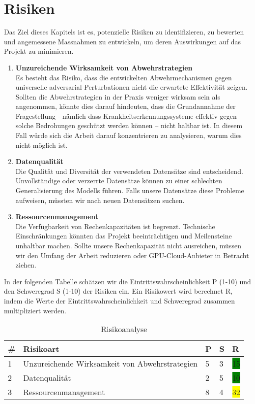 \section{Risiken}
Das Ziel dieses Kapitels ist es, potenzielle Risiken zu identifizieren, zu bewerten und angemessene Massnahmen zu entwickeln, um deren Auswirkungen auf das Projekt zu minimieren.

\begin{enumerate}
    \item \textbf{Unzureichende Wirksamkeit von Abwehrstrategien} \\ 
    Es besteht das Risiko, dass die entwickelten Abwehrmechanismen gegen universelle adversarial Perturbationen nicht die erwartete Effektivität zeigen. Sollten die Abwehrstrategien in der Praxis weniger wirksam sein als angenommen, könnte dies darauf hindeuten, dass die Grundannahme der Fragestellung - nämlich dass Krankheitserkennungssysteme effektiv gegen solche Bedrohungen geschützt werden können – nicht haltbar ist. In diesem Fall würde sich die Arbeit darauf konzentrieren zu analysieren, warum dies nicht möglich ist.

    \item \textbf{Datenqualität} \\
    Die Qualität und Diversität der verwendeten Datensätze sind entscheidend. Unvollständige oder verzerrte Datensätze können zu einer schlechten Generalisierung des Modells führen. Falls unsere Datensätze diese Probleme aufweisen, müssten wir nach neuen Datensätzen suchen.
    
    \item \textbf{Ressourcenmanagement} \\
    Die Verfügbarkeit von Rechenkapazitäten ist begrenzt. Technische Einschränkungen könnten das Projekt beeinträchtigen und Meilensteine unhaltbar machen. Sollte unsere Rechenkapazität nicht ausreichen, müssen wir den Umfang der Arbeit reduzieren oder GPU-Cloud-Anbieter in Betracht ziehen.

\end{enumerate}

In der folgenden Tabelle schätzen wir die Eintrittswahrscheinlichkeit P (1-10) und den Schweregrad S (1-10) der Risiken ein. Ein Risikowert wird berechnet R, indem die Werte der Eintrittswahrscheinlichkeit und Schweregrad zusammen multipliziert werden. 

\begin{table}[ht]
    \centering
    \begin{tabular}{@{}p{0.25cm}p{7cm}p{1cm}p{1cm}p{1cm}@{}}
        \toprule
        \textbf{\#} & \textbf{Risikoart} & \textbf{P} & \textbf{S} & \textbf{R} \\
        \midrule
        1 & Unzureichende Wirksamkeit von Abwehrstrategien & 5 & 3 & \colorbox{green}{15} \\
        \midrule
        2 & Datenqualität & 2 & 5 & \colorbox{green}{10} \\
        \midrule
        3 & Ressourcenmanagement & 8 & 4 & \colorbox{yellow}{32} \\
        \bottomrule
    \end{tabular}
    \caption{Risikoanalyse}
\end{table}


